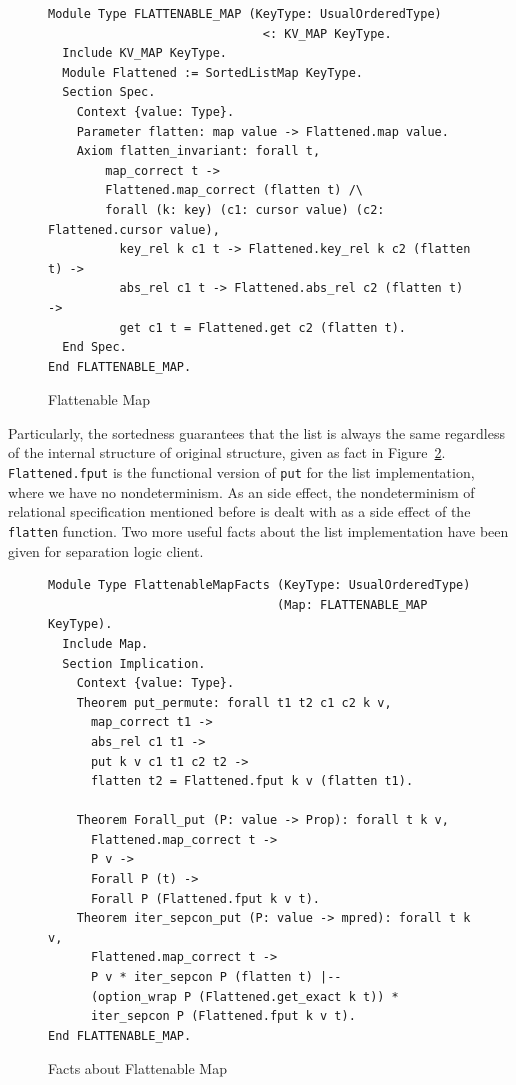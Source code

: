 \documentclass[runningheads]{llncs}
\begin{document}
\begin{figure}[htbp]
  \centering
\begin{verbatim}
Module Type FLATTENABLE_MAP (KeyType: UsualOrderedType)
                              <: KV_MAP KeyType.
  Include KV_MAP KeyType.
  Module Flattened := SortedListMap KeyType.
  Section Spec.
    Context {value: Type}.
    Parameter flatten: map value -> Flattened.map value.
    Axiom flatten_invariant: forall t,
        map_correct t ->
        Flattened.map_correct (flatten t) /\
        forall (k: key) (c1: cursor value) (c2: Flattened.cursor value),
          key_rel k c1 t -> Flattened.key_rel k c2 (flatten t) ->
          abs_rel c1 t -> Flattened.abs_rel c2 (flatten t) ->
          get c1 t = Flattened.get c2 (flatten t).
  End Spec.
End FLATTENABLE_MAP.
\end{verbatim}
  \caption{Flattenable Map}\label{fig:flatten}
\end{figure}

Particularly, the sortedness guarantees that the list is always the same
regardless of the internal structure of original structure, given as fact in
Figure~\ref{fig:flatten_fact}. \texttt{Flattened.fput} is the functional version
of \texttt{put} for the list implementation, where we have no nondeterminism. As
an side effect, the nondeterminism of relational specification mentioned before
is dealt with as a side effect of the \texttt{flatten} function. Two more useful
facts about the list implementation have been given for separation logic client.


\begin{figure}[htbp]
  \centering
\begin{verbatim}
Module Type FlattenableMapFacts (KeyType: UsualOrderedType)
                                (Map: FLATTENABLE_MAP KeyType).
  Include Map.
  Section Implication.
    Context {value: Type}.
    Theorem put_permute: forall t1 t2 c1 c2 k v,
      map_correct t1 ->
      abs_rel c1 t1 ->
      put k v c1 t1 c2 t2 ->
      flatten t2 = Flattened.fput k v (flatten t1).

    Theorem Forall_put (P: value -> Prop): forall t k v,
      Flattened.map_correct t ->
      P v ->
      Forall P (t) ->
      Forall P (Flattened.fput k v t).
    Theorem iter_sepcon_put (P: value -> mpred): forall t k v,
      Flattened.map_correct t ->
      P v * iter_sepcon P (flatten t) |--
      (option_wrap P (Flattened.get_exact k t)) *
      iter_sepcon P (Flattened.fput k v t).
End FLATTENABLE_MAP.
\end{verbatim}
  \caption{Facts about Flattenable Map}\label{fig:flatten_fact}
\end{figure}
\end{document}

